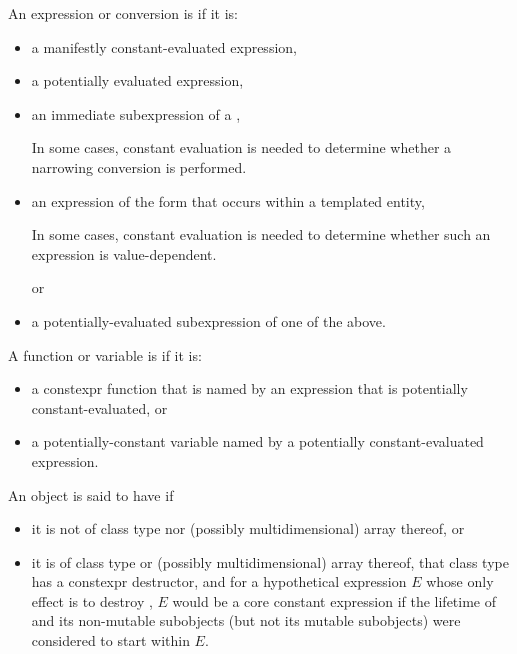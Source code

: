 \pnum
{}%
An expression or conversion is 
if it is:
\begin{itemize}
\item
a manifestly constant-evaluated expression,

\item
a potentially evaluated expression,

\item
an immediate subexpression of a ,
\begin{footnote}
In some cases, constant evaluation is needed to determine whether a narrowing conversion is performed.
\end{footnote}

\item
an expression of the form \tcode{\&} 
that occurs within a templated entity,
\begin{footnote}
In some cases, constant evaluation is needed to determine whether such an expression is value-dependent.
\end{footnote}
or

\item
a potentially-evaluated subexpression of one of the above.
\end{itemize}

%
%
A function or variable is
if it is:
\begin{itemize}
\item
a constexpr function that is named by an expression
that is potentially constant-evaluated, or

\item
a potentially-constant variable named by a potentially constant-evaluated expression.
\end{itemize}

\pnum
An object  is said to have  if
\begin{itemize}
\item
  it is not of class type nor (possibly multidimensional) array thereof, or
\item
  it is of class type or (possibly multidimensional) array thereof,
  that class type has a constexpr destructor, and
  for a hypothetical expression $E$
  whose only effect is to destroy ,
  $E$ would be a core constant expression
  if the lifetime of  and its non-mutable subobjects
  (but not its mutable subobjects) were considered to start within $E$.
\end{itemize}


